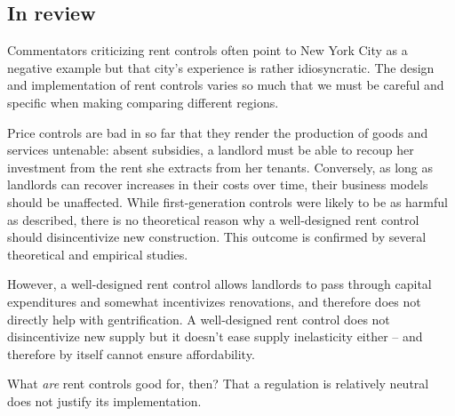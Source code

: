 \subsection{In review}

Commentators criticizing rent controls often point to New York City as a negative example but that city's experience is rather idiosyncratic. The design and implementation of rent controls varies so much that we must be careful and specific when making comparing different regions.

Price controls are bad in so far that they render the production of goods and services untenable: absent subsidies, a landlord must be able to recoup her investment from the rent she extracts from her tenants. Conversely, as long as landlords can recover increases in their costs over time, their business models should be unaffected. While first-generation controls were likely to be as harmful as described, there is no theoretical reason why a well-designed rent control should disincentivize new construction. This outcome is confirmed by several theoretical and empirical studies.

However, a well-designed rent control allows landlords to pass through capital expenditures and somewhat incentivizes renovations, and therefore does not directly help with gentrification. A well-designed rent control does not disincentivize new supply but it doesn't ease supply inelasticity either -- and therefore by itself cannot ensure affordability.


What \emph{are} rent controls good for, then? That a regulation is relatively neutral does not justify its implementation.
